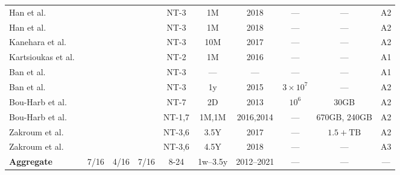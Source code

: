 \documentclass[manuscript,nonacm]{acmart}
\newcommand{\cmark}{\ding{51}}%
\begin{document}
\begin{table*}[h!]
\begin{tabular}{@{}lccccccccc@{}}
        Han et al.\textbf{~\cite{2020han}}~\cite{2022han}
        & \cite{2006takeuchi}
        & \cmark & \cmark
        & NT-3
        & 1M & 2018
        & --- & ---
        & A2 \\

        Han et al.\textbf{~\cite{2021han}}~\cite{2022han}
        & \cite{2020han,2006takeuchi,2019kanehara}
        & \cmark & 
        & NT-3
        & 1M & 2018
        & --- & ---
        & A2 \\

        Kanehara et al.\textbf{~\cite{2019kanehara}}~\cite{2022han}
        & \cite{2021han,2020han,2006takeuchi}
        & \cmark & \cmark
        & NT-3
        & 10M & 2017
        & --- & ---
        & A2 \\

        Kartsioukas et al.~\cite{2023kartsioukas}
        & \cite{2004lakhina}
        & \cmark & \cmark
        & NT-2
        & 1M & 2016
        & --- & ---
        & A1 \\

        Ban et al.~\cite{2017ban}
        & \cite{2012ban}
        &  & 
        & NT-3
        & --- & ---
        & --- & ---
        & A1 \\

        Ban et al.~\cite{2016ban}
        & 
        &  & 
        & NT-3
        & 1y & 2015
        & $3\times10^{7}$ & ---
        & A2 \\

        Bou-Harb et al.~\cite{2014bouharb}
        &  
        &  & 
        & NT-7
        & 2D & 2013
        & $10^6$ & 30GB
        & A2 \\

        Bou-Harb et al.\textbf{~\cite{2019bouharb}}~\cite{2015bouharb}
        & ~\cite{2018bouharb}
        &  & \cmark
        & NT-1,7
        & 1M,1M & 2016,2014
        & --- & 670GB, 240GB
        & A2 \\

        Zakroum et al.\textbf{~\cite{2022zakroum}}~\cite{2018zakroum}
        & ~\cite{2018zakroum}
        & & \cmark
        & NT-3,6
        & 3.5Y & 2017
        & --- & $1.5+\mathrm{TB}$
        & A2 \\

        Zakroum et al.~\cite{2023zakroum}
        & ~\cite{2023zakroum}
        & &
        & NT-3,6
        & 4.5Y & 2018
        & --- & ---
        & A3 \\

        \midrule
        \textbf{Aggregate}
        & 7/16
        & 4/16 & 7/16
        & 8-24
        & 1w--3.5y & 2012--2021
        & --- & ---
        & --- \\
        \bottomrule
    \end{tabular}
\end{table*}
\end{document}
